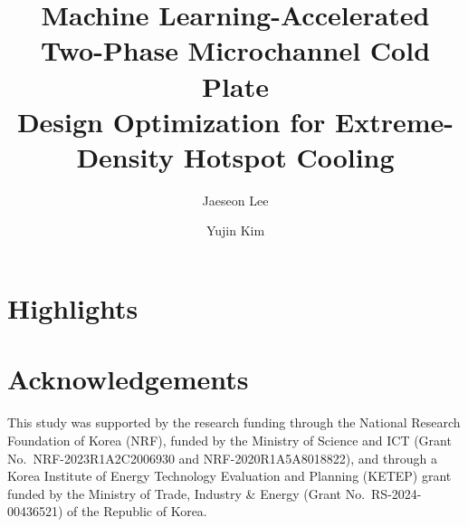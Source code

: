 \documentclass[review,1p,12pt,a4paper]{elsarticle}
\begin{document}
\linenumbers %

\begin{frontmatter}

\title{Machine Learning-Accelerated Two-Phase Microchannel Cold Plate \\
       Design Optimization for Extreme-Density Hotspot Cooling}

\author[unist]{Jaeseon Lee}
\author[unist]{Yujin Kim}


\address[unist]{Innovative Thermal Engineering Laboratory,
Department of Mechanical Engineering,
Ulsan National Institute of Science and Technology,
50 UNIST Rd., Ulsan 44919, Republic of Korea}




\end{frontmatter}

\section*{Highlights}










\section*{Acknowledgements}
This study was supported by the research funding through the National
Research Foundation of Korea (NRF), funded by the Ministry of Science and
ICT (Grant No.\ NRF-2023R1A2C2006930 and NRF-2020R1A5A8018822), and through
a Korea Institute of Energy Technology Evaluation and Planning (KETEP)
grant funded by the Ministry of Trade, Industry \& Energy (Grant No.\
RS-2024-00436521) of the Republic of Korea.
\end{document}
